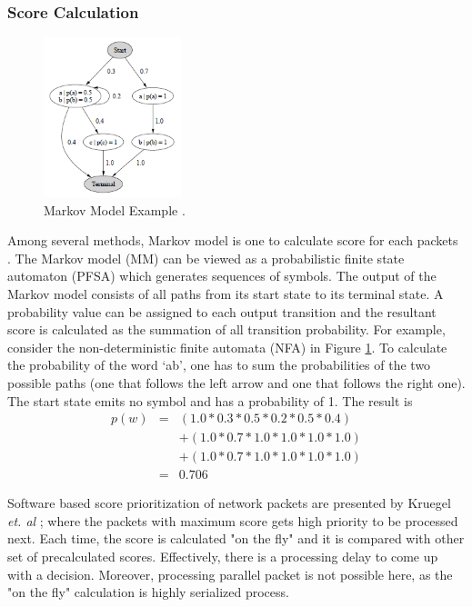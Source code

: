 \documentclass[10pt, conference, compsocconf]{IEEEtran}
\begin{document}
\subsubsection{Score Calculation}
\begin{figure}[h]
  \centering
  \includegraphics[width=4cm]{Figures/anomaly3.png}
      \caption{Markov Model Example \cite{baum}.}
    \label{anomaly3}
\end{figure}
Among several methods, Markov model is one to calculate score for each packets \cite{baum}. The Markov model (MM) can be viewed as a probabilistic finite state automaton (PFSA) which generates sequences of symbols. The output of the Markov model consists of all paths from its start state to its terminal state. A probability value can be assigned to each output transition and the resultant score is calculated as the summation of all transition probability. For example, consider the non-deterministic finite automata (NFA) in Figure \ref{anomaly3}. To calculate the probability of the word `ab', one has to sum the probabilities of the two possible paths (one that follows the left arrow and one that follows the right one). The start state emits no symbol and has a probability of 1. The result is
\begin{eqnarray}
p(w) &=& (1.0 * 0.3 * 0.5 * 0.2 * 0.5 * 0.4) \nonumber \\
     && + (1.0 * 0.7 * 1.0 * 1.0 * 1.0 * 1.0) \nonumber \\
     && + (1.0 * 0.7 * 1.0 * 1.0 * 1.0 * 1.0) \nonumber \\
     &=& 0.706
\end{eqnarray}


Software based score prioritization of network packets are presented by Kruegel {\it et. al} \cite{web}; where the packets with maximum score gets high priority to be processed next. Each time, the score is calculated "on the fly" and it is compared with other set of precalculated scores. Effectively, there is a processing delay to come up with a decision. Moreover, processing parallel packet is not possible here, as the "on the fly" calculation is highly serialized process.
\end{document}
